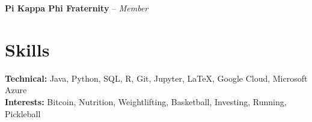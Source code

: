 \documentclass[11pt]{article}
\begin{document}
\vspace{0.1em}

\begin{adjustwidth}{0.5em}{0em}
\textbf{Pi Kappa Phi Fraternity} -- \textit{Member}
\end{adjustwidth}

\vspace{0.1em}


\section*{Skills}
\textbf{Technical:} Java, Python, SQL, R, Git, Jupyter, LaTeX, Google Cloud, Microsoft Azure\\ 
\textbf{Interests:} Bitcoin, Nutrition, Weightlifting, Basketball, Investing, Running, Pickleball 
\end{document}
